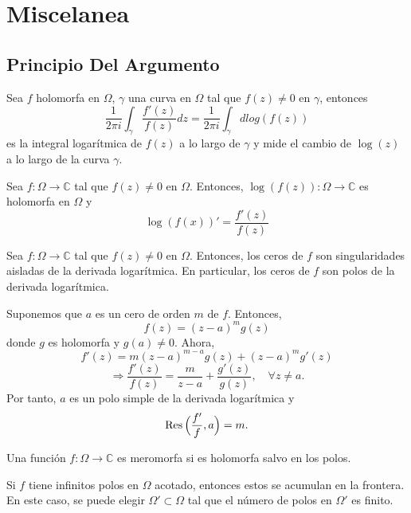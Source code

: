 \chapter{Miscelanea}

\section{Principio Del Argumento}

\begin{note}
  Sea $f$ holomorfa en $\Omega$, $\gamma$ una curva en $\Omega$ tal que $f(z) \neq 0$ en $\gamma$, entonces
  \[ 
    \frac{1}{2 \pi i} \int_{\gamma}^{} \frac{f'(z)}{f(z)} dz = \frac{1}{2 \pi i} \int_{\gamma}^{}  d log(f(z)) 
  \] 
  es la integral logarítmica de $f(z)$ a lo largo de $\gamma$ y mide el cambio de $\log(z)$ a lo largo de la curva $\gamma$.
\end{note}

\begin{note}
  Sea $f : \Omega \to \mathbb{C}$ tal que $f(z) \neq 0$ en $\Omega$. Entonces, $\log(f(z)) :  \Omega \to \mathbb{C}$ es holomorfa en $\Omega$ y
  \[ 
    \log(f(x))' = \frac{f'(z)}{f(z)}
  \] 
\end{note}

\begin{prop}
  Sea $f : \Omega \to \mathbb{C}$ tal que $f(z) \neq 0$ en $\Omega$. Entonces, los ceros de $f$ son singularidades aisladas de la derivada logarítmica. En particular, los ceros de $f$ son polos de la derivada logarítmica.
\end{prop}

\begin{dem}
  Suponemos que $a$ es un cero de orden $m$ de $f$. Entonces, 
  \[ 
    f(z) = (z - a)^{m} g(z)
  \] 
  donde $g$ es holomorfa y $g(a) \neq 0$. Ahora,
  \[ 
    f'(z) = m(z - a)^{m - a} g(z) + (z - a)^{m} g'(z)
  \] 
  \[ 
    \Rightarrow \frac{f'(z)}{f(z)} = \frac{m}{z - a} + \frac{g'(z)}{g(z)}, \quad \forall z \neq a.
  \] 
  Por tanto, $a$ es un polo simple de la derivada logarítmica y
  \[
    \operatorname{Res} \Big ( \frac{f'}{f}, a \Big ) = m.
  \]
\end{dem}

\begin{defn}[Meromorfa]
  Una función $f : \Omega \to \mathbb{C}$ es meromorfa si es holomorfa salvo en los polos.
\end{defn}

\begin{obs}
  Si $f$ tiene infinitos polos en $\Omega$ acotado, entonces estos se acumulan en la frontera. En este caso, se puede elegir $\Omega' \subset \Omega$ tal que el número de polos en $\Omega'$ es finito.
\end{obs}

